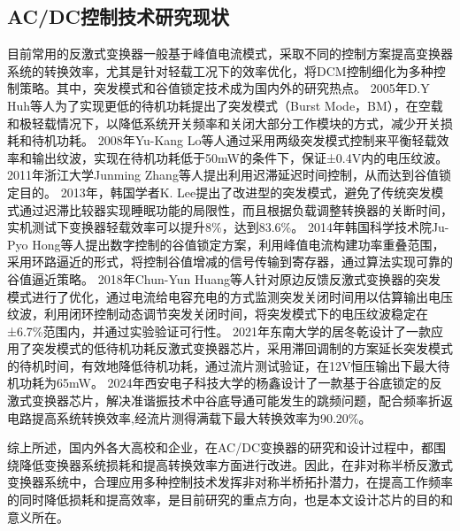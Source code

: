 \subsection{AC/DC控制技术研究现状}

目前常用的反激式变换器一般基于峰值电流模式，采取不同的控制方案提高变换器系统的转换效率，尤其是针对轻载工况下的效率优化，将DCM控制细化为多种控制策略。其中，突发模式和谷值锁定技术成为国内外的研究热点。
2005年D.Y Huh等人为了实现更低的待机功耗提出了突发模式（Burst Mode，BM），在空载和极轻载情况下，以降低系统开关频率和关闭大部分工作模块的方式，减少开关损耗和待机功耗\cite{choi2005_BM1}。
2008年Yu-Kang Lo等人通过采用两级突发模式控制来平衡轻载效率和输出纹波，实现在待机功耗低于50mW的条件下，保证±0.4V内的电压纹波\cite{lo2008_BM2}。
2011年浙江大学Junming Zhang等人提出利用迟滞延迟时间控制，从而达到谷值锁定目的\cite{zhang2011_vallye_switch1}。
2013年，韩国学者K. Lee提出了改进型的突发模式，避免了传统突发模式通过迟滞比较器实现睡眠功能的局限性，而且根据负载调整转换器的关断时间，实机测试下变换器轻载效率可以提升8\%，达到83.6\%\cite{lee2013improvement_BM}。
2014年韩国科学技术院Ju-Pyo Hong等人提出数字控制的谷值锁定方案，利用峰值电流构建功率重叠范围，采用环路逼近的形式，将控制谷值增减的信号传输到寄存器，通过算法实现可靠的谷值逼近策略\cite{hong2014_vallye_switch2}。
2018年Chun-Yun Huang等人针对原边反馈反激式变换器的突发模式进行了优化，通过电流给电容充电的方式监测突发关闭时间用以估算输出电压纹波，利用闭环控制动态调节突发关闭时间，将突发模式下的电压纹波稳定在±6.7\%范围内，并通过实验验证可行性\cite{huang2018primary_BM}。
2021年东南大学的居冬乾设计了一款应用了突发模式的低待机功耗反激式变换器芯片，采用滞回调制的方案延长突发模式的待机时间，有效地降低待机功耗，通过流片测试验证，在12V恒压输出下最大待机功耗为65mW\cite{1022468700.nh}。
2024年西安电子科技大学的杨鑫设计了一款基于谷底锁定的反激式变换器芯片，解决准谐振技术中谷底导通可能发生的跳频问题，配合频率折返电路提高系统转换效率,经流片测得满载下最大转换效率为90.20\%\cite{1025242407.nh}。


综上所述，国内外各大高校和企业，在AC/DC变换器的研究和设计过程中，都围绕降低变换器系统损耗和提高转换效率方面进行改进。因此，在非对称半桥反激式变换器系统中，合理应用多种控制技术发挥非对称半桥拓扑潜力，在提高工作频率的同时降低损耗和提高效率，是目前研究的重点方向，也是本文设计芯片的目的和意义所在。
\fi




